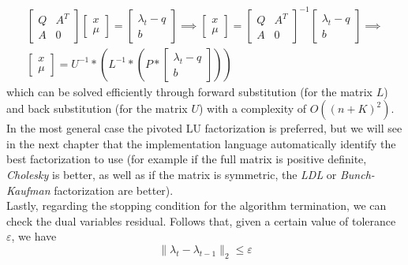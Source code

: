 \documentclass[notitlepage]{article}
\begin{document}
\begin{gather*}
  \begin{bmatrix}
    Q & A^T \\[1ex]
    A & 0 
  \end{bmatrix} 
  \begin{bmatrix}
    x \\[1ex]
    \mu
  \end{bmatrix}
  = 
  \begin{bmatrix}
    \lambda_t - q \\[1ex]
    b
  \end{bmatrix}
  \boldsymbol{\implies} 
  \begin{bmatrix}
    x \\[1ex]
    \mu
  \end{bmatrix}
  = 
  \begin{bmatrix}
    Q & A^T \\[1ex]
    A & 0 
  \end{bmatrix}^{-1}
  \begin{bmatrix}
    \lambda_t - q \\[1ex]
    b
  \end{bmatrix}
  \boldsymbol{\implies} \\
  \begin{bmatrix}
    x \\[1ex]
    \mu
  \end{bmatrix}
  = 
  U^{-1} * \left(L^{-1} * \left(P * \begin{bmatrix}
    \lambda_t - q \\[1ex]
    b
  \end{bmatrix}\right) \right)
\end{gather*}
which can be solved efficiently through forward substitution (for the matrix $L$) and back substitution (for the matrix $U$) with a complexity of $O((n+K)^2)$.\\
In the most general case the pivoted LU factorization is preferred, but we will see in the next chapter that the implementation language automatically identify the best 
factorization to use (for example if the full matrix is positive definite, \textit{Cholesky} is better, as well as if the matrix is symmetric, the \textit{LDL} or \textit{Bunch-Kaufman} factorization are better).\\ 
Lastly, regarding the stopping condition for the algorithm termination, we can check the dual variables residual. Follows that, given a certain value of tolerance $\varepsilon$, we have %
\begin{equation}
    \|\lambda_{t} - \lambda_{t-1}\|_2 \le \varepsilon
  \label{eqn:stopping-condition}
\end{equation}
\end{document}
